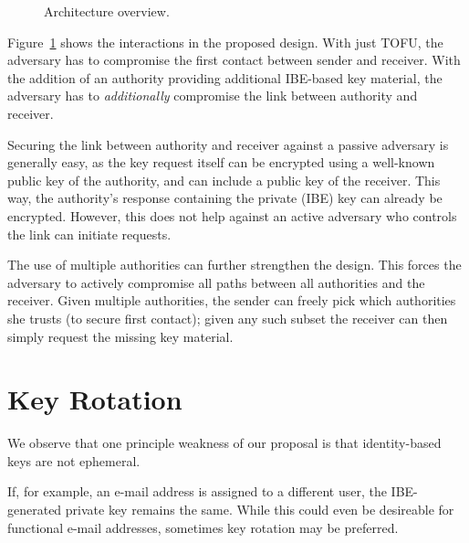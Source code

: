 \documentclass[twoside,letterpaper]{sig-alternate}
\begin{document}
\begin{figure}[h]
\centering
{}
\caption{Architecture overview.}
\label{fig:arch}
\end{figure}

Figure~\ref{fig:arch} shows the interactions in the proposed design.
With just TOFU, the adversary has to compromise the first contact
between sender and receiver.  With the addition of an authority
providing additional IBE-based key material, the adversary has to {\em
  additionally} compromise the link between authority and receiver.

Securing the link between authority and receiver against a passive
adversary is generally easy, as the key request itself can be
encrypted using a well-known public key of the authority, and can
include a public key of the receiver. This way, the authority's
response containing the private (IBE) key can already be encrypted.
However, this does not help against an active adversary who controls
the link can initiate requests.


The use of multiple authorities can further strengthen the design.
This forces the adversary to actively compromise all paths between all
authorities and the receiver.  Given multiple authorities, the sender
can freely pick which authorities she trusts (to secure first
contact); given any such subset the receiver can then simply request
the missing key material.


\section{Key Rotation}

We observe that one principle weakness of our proposal is that
identity-based keys are not ephemeral.

If, for example, an e-mail address is assigned to a different user,
the IBE-generated private key remains the same.  While this could
even be desireable for functional e-mail addresses, sometimes key
rotation may be preferred.
\end{document}
